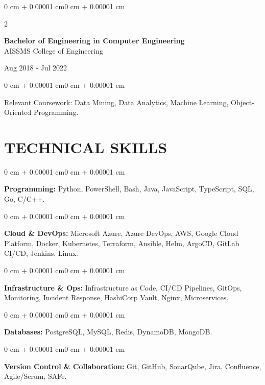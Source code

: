 \documentclass[10pt, letterpaper]{article}
\newenvironment{onecolentry}{
    \begin{adjustwidth}{0 cm + 0.00001 cm}{0 cm + 0.00001 cm}
}{
    \end{adjustwidth}
}
\newenvironment{twocolentry}[2][]{
    \onecolentry
    \def\secondColumn{#2}
    \setcolumnwidth{\fill, 4.5 cm}
    \begin{paracol}{2}
}{
    \switchcolumn \raggedleft \secondColumn
    \end{paracol}
    \endonecolentry
}
\begin{document}
\begin{twocolentry}{
    Aug 2018 - Jul 2022
}
    \textbf{Bachelor of Engineering in Computer Engineering} \\
    AISSMS College of Engineering
\end{twocolentry}
\begin{onecolentry}
Relevant Coursework: Data Mining, Data Analytics, Machine Learning, Object-Oriented Programming.
\end{onecolentry}
\section{TECHNICAL SKILLS}
\begin{onecolentry}
\textbf{Programming:} Python, PowerShell, Bash, Java, JavaScript, TypeScript, SQL, Go, C/C++.
\end{onecolentry}
\vspace{0.06 cm}
\begin{onecolentry}
\textbf{Cloud \& DevOps:} Microsoft Azure, Azure DevOps, AWS, Google Cloud Platform, Docker, Kubernetes, Terraform, Ansible, Helm, ArgoCD, GitLab CI/CD, Jenkins, Linux.
\end{onecolentry}
\vspace{0.06 cm}
\begin{onecolentry}
\textbf{Infrastructure \& Ops:} Infrastructure as Code, CI/CD Pipelines, GitOps, Monitoring, Incident Response, HashiCorp Vault, Nginx, Microservices.
\end{onecolentry}
\vspace{0.06 cm}
\begin{onecolentry}
\textbf{Databases:} PostgreSQL, MySQL, Redis, DynamoDB, MongoDB.
\end{onecolentry}
\vspace{0.06 cm}
\begin{onecolentry}
\textbf{Version Control \& Collaboration:} Git, GitHub, SonarQube, Jira, Confluence, Agile/Scrum, SAFe.
\end{onecolentry}

\end{document}

